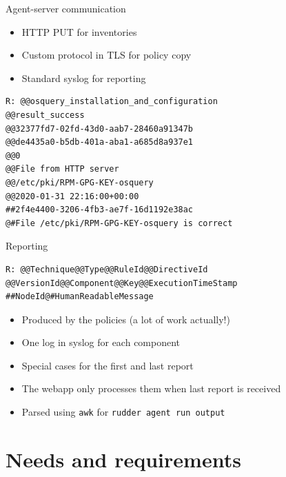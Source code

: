 \documentclass[aspectratio=169, 14pt]{beamer}
\begin{document}
\begin{frame}{Agent-server communication}

	\note{
	}
	\begin{itemize}
		\item HTTP PUT for inventories
		\item Custom protocol in TLS for policy copy
		\item Standard syslog for reporting
	\end{itemize}
\end{frame}

\begin{frame}[fragile]
	\begin{verbatim}
R: @@osquery_installation_and_configuration
@@result_success
@@32377fd7-02fd-43d0-aab7-28460a91347b
@@de4435a0-b5db-401a-aba1-a685d8a937e1
@@0
@@File from HTTP server
@@/etc/pki/RPM-GPG-KEY-osquery
@@2020-01-31 22:16:00+00:00
##2f4e4400-3206-4fb3-ae7f-16d1192e38ac
@#File /etc/pki/RPM-GPG-KEY-osquery is correct
\end{verbatim}
\end{frame}

\begin{frame}[fragile]{Reporting}

	\begin{verbatim}
R: @@Technique@@Type@@RuleId@@DirectiveId
@@VersionId@@Component@@Key@@ExecutionTimeStamp
##NodeId@#HumanReadableMessage
\end{verbatim}

	\begin{itemize}
		\item Produced by the policies (a lot of work actually!)
		\item One log in syslog for each component
		\item Special cases for the first and last report
		\item The webapp only processes them when last report is received
		\item Parsed using \texttt{awk} for \texttt{rudder agent run output}
	\end{itemize}
\end{frame}

\section{Needs and requirements}
\end{document}
